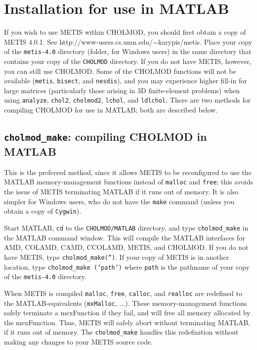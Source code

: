 \documentclass[11pt]{article}
\begin{document}
\newpage \section{Installation for use in MATLAB}

If you wish to use METIS within CHOLMOD, you should first obtain a copy of METIS 4.0.1.
See http://www-users.cs.umn.edu/$\sim$karypis/metis.  Place your copy
of the {\tt metis-4.0} directory (folder, for Windows users) in the same directory
that contains your copy of the {\tt CHOLMOD} directory. If you do not have
METIS, however, you can still use CHOLMOD.  Some of the CHOLMOD functions will not
be available ({\tt metis}, {\tt bisect}, and {\tt nesdis}),
and you may experience higher fill-in for large matrices
(particularly those arising in 3D finite-element problems) when using
{\tt analyze}, {\tt chol2}, {\tt cholmod2}, {\tt lchol}, and {\tt ldlchol}.
There are two methods for compiling CHOLMOD for use in MATLAB; both
are described below.

\subsection{{\tt cholmod\_make}: compiling CHOLMOD in MATLAB}

This is the preferred method, since it allows METIS to be reconfigured to
use the MATLAB memory-management functions instead of {\tt malloc} and {\tt free};
this avoids the issue of METIS terminating MATLAB if it runs out of memory.
It is also simpler for Windows users, who do not have the {\tt make}
command (unless you obtain a copy of {\tt Cygwin}).

Start MATLAB, {\tt cd} to the {\tt CHOLMOD/MATLAB} directory, and
type {\tt cholmod\_make} in the MATLAB command window.  This will compile
the MATLAB interfaces for AMD, COLAMD, CAMD, CCOLAMD, METIS, and CHOLMOD.
If you do not have METIS, type {\tt cholmod\_make('')}.
If your copy of METIS is in another location, type
{\tt cholmod\_make ('path')} where {\tt path} is the pathname
of your copy of the {\tt metis-4.0} directory.

When METIS is compiled {\tt malloc}, {\tt free}, {\tt calloc}, and {\tt realloc}
are redefined to the MATLAB-equivalents ({\tt mxMalloc}, ...).
These memory-management functions safely terminate a mexFunction if they
fail, and will free all memory allocated by the mexFunction.
Thus, METIS will safely abort without terminating MATLAB, if it runs out
of memory.
The {\tt cholmod\_make} handles this redefinition without making any
changes to your METIS source code.
\end{document}
